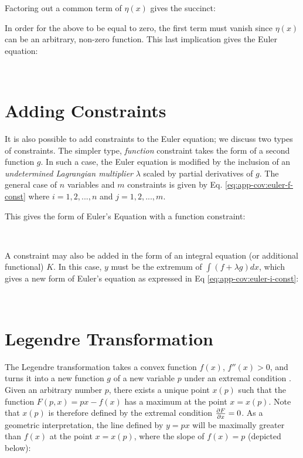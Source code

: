 Factoring out a common term of $\eta(x)$ gives the succinct:


In order for the above to be equal to zero, the first term must vanish since $\eta(x)$ can be an arbitrary, non-zero function. This last implication gives the Euler equation:

\


\section{Adding Constraints}
It is also possible to add constraints to the Euler equation; we discuss two types of constraints. The simpler type, \textit{function} constraint takes the form of a second function $g$. In such a case, the Euler equation is modified by the inclusion of an \textit{undetermined Lagrangian multiplier} $\lambda$ scaled by partial derivatives of $g$. The general case of $n$ variables and $m$ constraints is given by Eq. \ref{eq:app-cov:euler-f-const} where $i = 1, 2, ..., n$ and $j = 1, 2, ..., m$.


This gives the form of Euler's Equation with a function constraint:

\

A constraint may also be added in the form of an integral equation (or additional functional) $K$. In this case, $y$ must be the extremum of $\int(f + \lambda g)dx$, which gives a new form of Euler's equation as expressed in Eq \ref{eq:app-cov:euler-i-const}:

\

\section{Legendre Transformation}
\label{sec:app-calc-var-legendre}
The Legendre transformation takes a convex function $f(x)$, $f''(x) > 0$, and turns it into a new function $g$ of a new variable $p$ under an extremal condition \cite{arnoldMathematicalMethodsClassical1997}. Given an arbitrary number $p$, there exists a unique point $x(p)$ such that the function $F(p, x) = px - f(x)$ has a maximum at the point $x = x(p)$. Note that $x(p)$ is therefore defined by the extremal condition $\frac{\partial F}{\partial x}=0$.
As a geometric interpretation, the line defined by $y=px$ will be maximally greater than $f(x)$ at the point $x=x(p)$, where the slope of $f(x) = p$ (depicted below):

